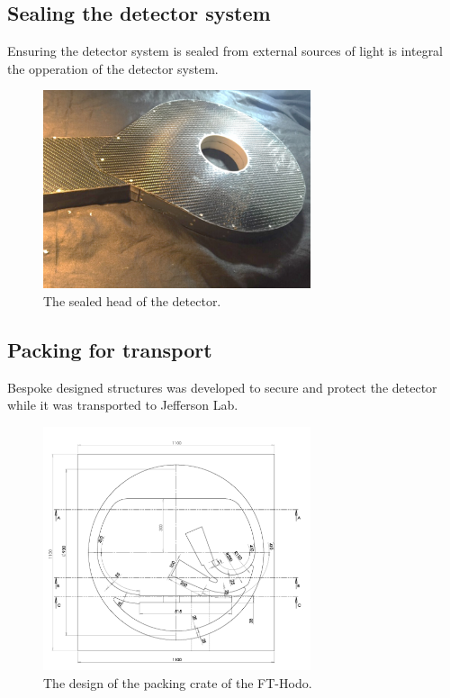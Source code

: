 

\subsection{Sealing the detector system}

Ensuring the detector system is sealed from external sources of light is integral the opperation of the detector system.

\begin{figure}
	\centering
	\includegraphics[width=0.7\textwidth]{ImgChap1/sealed}
	\caption{The sealed head of the detector.}		
	\label{sealedlollypop}
\end{figure}

\subsection{Packing for transport}

Bespoke designed structures was developed to secure and protect the detector while it was transported to Jefferson Lab.

\begin{figure}
	\centering
	\includegraphics[width=0.7\textwidth]{ImgChap1/packing}
	\caption{The design of the packing crate of the FT-Hodo.}		
	\label{packing}
\end{figure}

